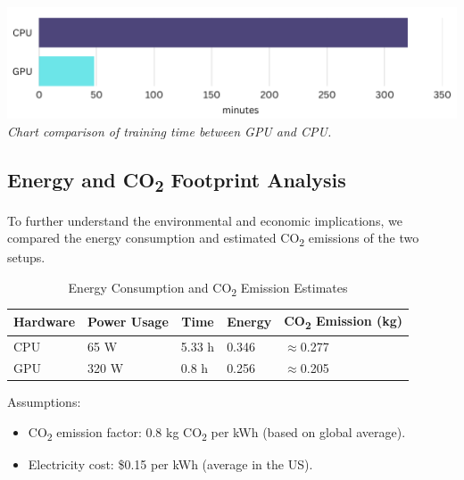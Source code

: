 \vspace{1em}
\begin{center} 
    \includegraphics[width=\textwidth]{../assets/07-results/graph-cpu-vs-gpu.png} 
    \small\textit{Chart comparison of training time between GPU and CPU.} 
\end{center}
\vspace{1em} 


\subsection{Energy and CO\textsubscript{2} Footprint Analysis}

To further understand the environmental and economic implications, we compared the energy 
consumption and estimated CO\textsubscript{2} emissions of the two setups.

\begin{table}[H]
\centering
\begin{tabular}{|c|c|c|c|c|}
\hline
\textbf{Hardware} & \textbf{Power Usage} & \textbf{Time} & \textbf{Energy} & 
\textbf{CO\textsubscript{2} Emission (kg)} \\
\hline
\multicolumn{1}{|l|}{CPU} & 
\multicolumn{1}{l|}{65 W} & 
\multicolumn{1}{l|}{5.33 h} & 
\multicolumn{1}{l|}{0.346} & 
\multicolumn{1}{l|}{$\approx$0.277} \\
\hline
\multicolumn{1}{|l|}{GPU} & 
\multicolumn{1}{l|}{320 W} & 
\multicolumn{1}{l|}{0.8 h} & 
\multicolumn{1}{l|}{0.256} & 
\multicolumn{1}{l|}{$\approx$0.205} \\
\hline
\end{tabular}
\caption{Energy Consumption and CO\textsubscript{2} Emission Estimates}
\end{table}


\newpage
Assumptions:
\begin{itemize}
    \item CO\textsubscript{2} emission factor: 0.8 kg CO\textsubscript{2} per kWh 
    (based on global average).
    \item Electricity cost: \$0.15 per kWh (average in the US).
\end{itemize}

